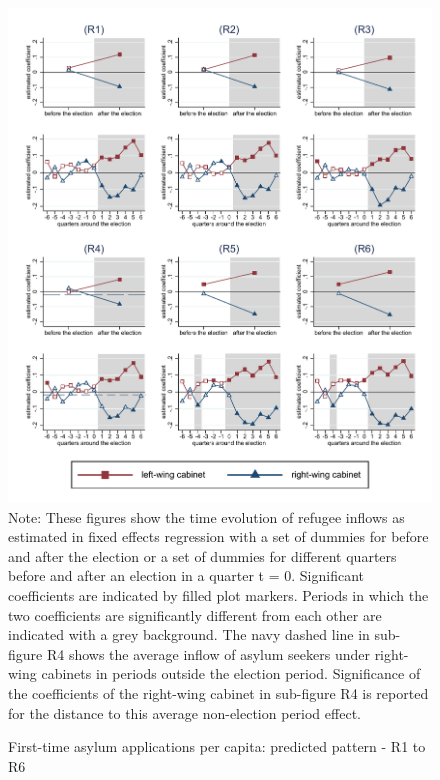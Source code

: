 \documentclass[11pt,a4paper]{scrartcl}
\begin{document}
\clearpage
\FloatBarrier
\begin{figure}[!ht]
	\caption{First-time asylum applications per capita: predicted pattern - R1 to R6}
	\includegraphics[width=1\textwidth]{../results/applications/app_graphs_R1-R6.pdf}
	\scriptsize{Note: These figures show the time evolution of refugee inflows as estimated in fixed effects regression
		with a set of dummies for before and after the election or a set of dummies for different quarters before and after an election in a quarter t = 0. Significant coefficients are indicated by filled plot markers. Periods in which the two coefficients are significantly different from each other are indicated with a grey background. The navy dashed line in sub-figure R4 shows the average inflow of asylum seekers under right-wing cabinets in periods outside the election period. Significance of the coefficients of the right-wing cabinet in sub-figure R4 is reported for the distance to this average non-election period effect.}
\end{figure}

%
%
%
%
%
%
%
\end{document}
